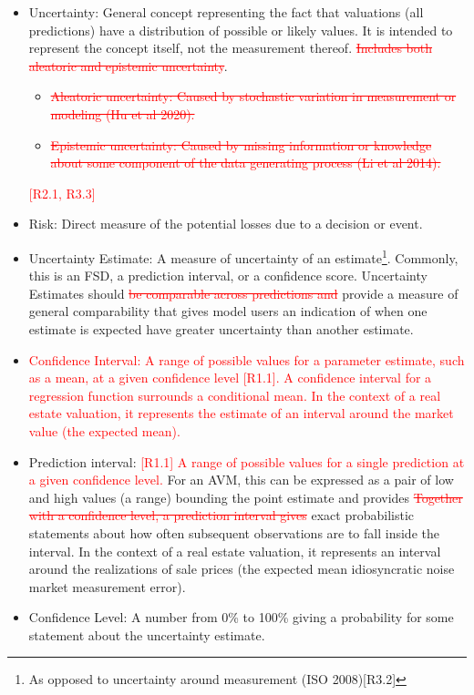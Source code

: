 \documentclass[colTwo]{anon}
\theoremstyle{definition}
\begin{document}
\begin{itemize}
\item Uncertainty: General concept representing the fact that valuations (all predictions) have a distribution of possible or likely values.  It is intended to represent the concept itself, not the measurement thereof. \textcolor{red}{\st{Includes both aleatoric and epistemic uncertainty}}.
  \begin{itemize}
    \item \textcolor{red}{\st{Aleatoric uncertainty: Caused by stochastic variation in measurement or modeling (Hu et al 2020).}}
    \item \textcolor{red}{\st{Epistemic uncertainty: Caused by missing information or knowledge about some component of the data generating process (Li et al 2014).}}
  \end{itemize}\textcolor{red}{[R2.1, R3.3]}
\item Risk: Direct measure of the potential losses due to a decision or event.
\item Uncertainty Estimate: A measure of uncertainty of an estimate\footnote{As opposed to uncertainty around measurement (ISO 2008)[R3.2]}. Commonly, this is an FSD, a prediction interval, or a confidence score. Uncertainty Estimates should \textcolor{red}{\st{be comparable across predictions and}} provide a measure of general comparability that gives model users an indication of when one estimate is expected have greater uncertainty than another estimate.
\item \textcolor{red}{Confidence Interval: A range of possible values for a parameter estimate, such as a mean, at a given confidence level [R1.1]. A confidence interval for a regression function surrounds a conditional mean. In the context of a real estate valuation, it represents the estimate of an interval around the market value (the expected mean).}
\item Prediction interval: \textcolor{red}{[R1.1] A range of possible values for a single prediction at a given confidence level.} For an AVM, this can be expressed as a pair of low and high values (a range) bounding the point estimate and provides \textcolor{red}{\st{Together with a confidence level, a prediction interval gives}} exact probabilistic statements about how often subsequent observations are to fall inside the interval. In the context of a real estate valuation, it represents an interval around the realizations of sale prices (the expected mean \plus idiosyncratic noise \plus market measurement error). 
\item Confidence Level: A number from 0\% to 100\% giving a probability for some statement about the uncertainty estimate.

\end{itemize}
\end{document}

